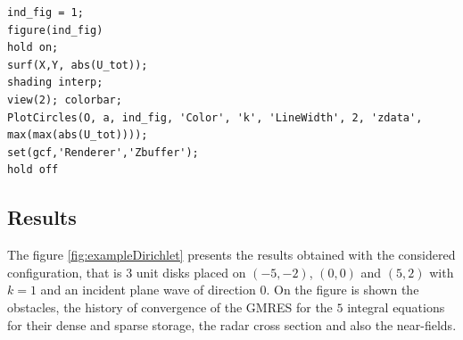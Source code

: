 \begin{lstlisting}
ind_fig = 1;
figure(ind_fig)
hold on;
surf(X,Y, abs(U_tot));
shading interp;
view(2); colorbar;
PlotCircles(O, a, ind_fig, 'Color', 'k', 'LineWidth', 2, 'zdata', max(max(abs(U_tot))));
set(gcf,'Renderer','Zbuffer');
hold off
\end{lstlisting}

\subsection{Results}

The figure \ref{fig:exampleDirichlet} presents the results obtained with the considered configuration, that is $3$ unit disks placed on $(-5,-2)$, $(0,0)$ and $(5,2)$ with $k=1$ and an incident plane wave of direction $0$. On the figure is shown the obstacles, the history of convergence of the GMRES for the $5$ integral equations for their dense and sparse storage, the radar cross section and also the near-fields.

